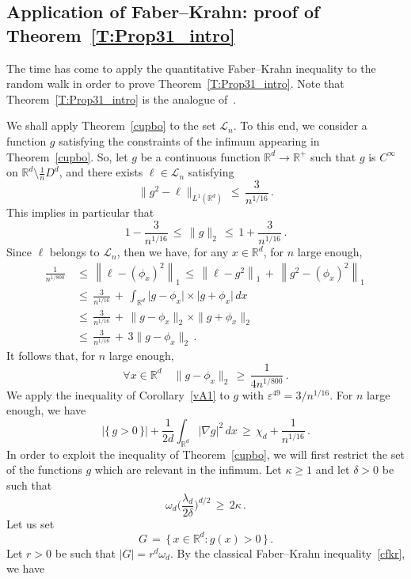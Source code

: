 \documentclass[10pt]{amsart}
\theoremstyle{definition}\newtheorem{defi}[theo]{Definition}\newtheorem{rema}[theo]{Remark}\newtheorem{exam}[theo]{Example}\newtheorem{exem}[theo]{Example}\newtheorem{nota}[theo]{Notation}
\newcommand*\Rd {{\mathbb R^d}}
\newcommand*\R{\mathbb{R}}
\newcommand{\cL}{\mathcal{L}}
\let\oldforall\forall
\renewcommand*{\forall}{\mathrel{\oldforall}}
\begin{document}
\subsection{Application of Faber--Krahn: proof of Theorem~\ref{T:Prop31_intro}}

The time has come to apply the quantitative Faber--Krahn inequality to the random walk in order to prove Theorem~\ref{T:Prop31_intro}. Note that Theorem~\ref{T:Prop31_intro} is the analogue of~\cite[Proposition~3.1]{BO}.


We shall apply Theorem~\ref{cupbo} to the set $\cL_n$. To this end, we consider a function $g$ satisfying the constraints of the infimum appearing in Theorem~\ref{cupbo}. So, let $g$ be a continuous function $\Rd\to\R^+$ such that $g$ is $C^\infty$ on $\Rd\setminus \frac{1}{n}D^d$, and there exists $\ell\in\cL_n$ satisfying
\[
\big\|g^2- \ell\big\|_{L^1(\Rd)}
\,\leq\,
\frac{3}{n^{1/16}}\,.
\]
This implies in particular that
\[
1-\frac{3}{n^{1/16}}\,\leq\,
\big\| g\big\|_2\,\leq\, 1+\frac{3}{n^{1/16}}
\,.
\]
Since $\ell$ belongs to $\cL_n$, then we have, for any $x\in\Rd$, for $n$ large enough,
\begin{align*}
\frac{1}{n^{1/800}} &\,\leq\, \left\|\ell-(\phi_x)^2\right\|_1\,\leq\, \left\|\ell-g^2\right\|_1\,+\, \left\|g^2-(\phi_x)^2\right\|_1\,\\ &\,\leq\,
\frac{3}{n^{1/16}}\,+\,
\int_{\Rd}
\big|g -\phi_x\big|\times
\big|g +\phi_x\big|
\,dx\\ &\,\leq\, \frac{3}{n^{1/16}}\,+\, \|g-\phi_x\|_2\times \|g+\phi_x\|_2\\ &\,\leq\, \frac{3}{n^{1/16}}\,+\, 3\|g-\phi_x\|_2
\,.
\end{align*}
It follows that, for $n$ large enough,
\[
\forall x\in\Rd\quad \|g-\phi_x\|_2\,\geq\,
\frac{1}{4n^{1/800}}\,.
\]
We apply the inequality of Corollary~\ref{vA1} to $g$ with $\varepsilon^{49}=3/{n^{1/16}}$. For $n$ large enough, we have
\begin{equation}\label{zntert}
\big|\{\,g>0\,\}\big|+\frac{1}{2d}
\int_{\Rd}\big|\nabla g\big|^2\,dx\,\geq\,\chi_d+
\frac{1}{n^{1/16}}\,.
\end{equation}
In order to exploit the inequality of Theorem~\ref{cupbo}, we will first restrict the set of the functions $g$ which are relevant in the infimum. Let $\kappa\geq 1$ and let $\delta>0$ be such that
\[
\omega_d
\Big(\frac{\lambda_d}{{2}\delta}\Big)^{d/2}\,\geq\,2\kappa\,.
\]
Let us set
\[
G\,=\,\big\{\,x\in \Rd:g(x)>0\,\big\}\,.
\]
Let $r>0$ be such that $|G|=r^d\omega_d$. By the classical Faber--Krahn inequality~\eqref{cfkr}, we have
\end{document}
